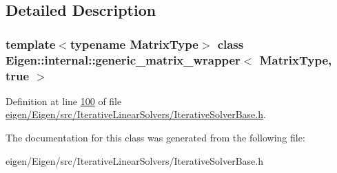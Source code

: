 \subsection{Detailed Description}
\subsubsection*{template$<$typename Matrix\+Type$>$\newline
class Eigen\+::internal\+::generic\+\_\+matrix\+\_\+wrapper$<$ Matrix\+Type, true $>$}



Definition at line \hyperlink{eigen_2_eigen_2src_2_iterative_linear_solvers_2_iterative_solver_base_8h_source_l00100}{100} of file \hyperlink{eigen_2_eigen_2src_2_iterative_linear_solvers_2_iterative_solver_base_8h_source}{eigen/\+Eigen/src/\+Iterative\+Linear\+Solvers/\+Iterative\+Solver\+Base.\+h}.



The documentation for this class was generated from the following file\+:\begin{DoxyCompactItemize}
\item 
eigen/\+Eigen/src/\+Iterative\+Linear\+Solvers/\+Iterative\+Solver\+Base.\+h\end{DoxyCompactItemize}
